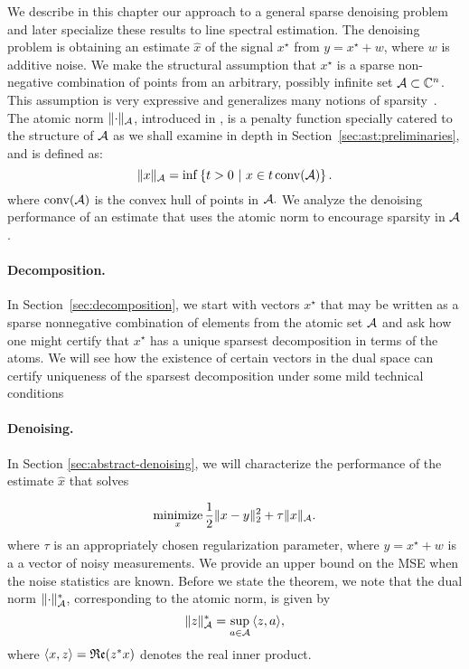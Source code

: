 We describe in this chapter our approach to a general sparse denoising problem
and later specialize these results to line spectral estimation. The denoising
problem is obtaining an estimate $\hat{x}$ of the signal $x^\star$ from $y =
x^\star + w$, where $w$ is additive noise. We make the structural assumption
that $x^\star$ is a sparse non-negative combination of points from an arbitrary,
possibly infinite set $\mathcal{A} \subset \mathbb{C}^n$. This assumption is very expressive and
generalizes many notions of sparsity~\cite{crpw}. The atomic norm
$\lVert\cdot\rVert_{\mathcal{A}}$, introduced in \cite{crpw}, is a penalty function specially
catered to the structure of $\mathcal{A}$ as we shall examine in depth in Section~\ref{sec:ast:preliminaries},
and is defined as: \begin{equation*} \lVert x\rVert_{\mathcal{A}} = \inf\left\{t > 0 ~\middle|~
x \in t \operatorname{conv}(\mathcal{A}) \right\}. \end{equation*} where $\operatorname{conv}(\mathcal{A})$ is the convex hull
of points in $\mathcal{A}.$ We analyze the denoising performance of an estimate that uses
the atomic norm to encourage sparsity in $\mathcal{A}$.

\paragraph*{Decomposition.} In Section~\ref{sec:decomposition}, we start with
vectors $x^\star$ that may be written as a sparse nonnegative combination of
elements from the atomic set $\mathcal{A}$ and ask how one might certify that $x^\star$
has a unique sparsest decomposition in terms of the atoms. We will see how the
existence of certain vectors in the dual space can certify uniqueness of the
sparsest decomposition under some mild technical conditions

\paragraph*{Denoising.} In Section \ref{sec:abstract-denoising},
we will characterize the performance of the estimate $\hat{x}$ that solves

\begin{equation}
\label{AST}\mathop{\textrm{minimize}}_x \frac{1}{2} \lVert x - y\rVert_2^2 + \tau \lVert x\rVert_{\mathcal{A}}.
\end{equation}
where $\tau$ is an appropriately chosen regularization parameter, where $y = x^\star + w$ is a a vector of noisy measurements. We provide an
upper bound on the MSE when the noise statistics are known. Before we state the
theorem, we note that the dual norm $\lVert\cdot\rVert_{\mathcal{A}}^*$, corresponding to the
atomic norm, is given by
\[
 \lVert z\rVert_{\mathcal{A}}^* = \sup_{a \in \mathcal{A}}{\langle z, a\rangle},
\]
where $\langle x, z\rangle = \mathop{\mathfrak{Re}}(z^*x)$ denotes the real inner product.  


